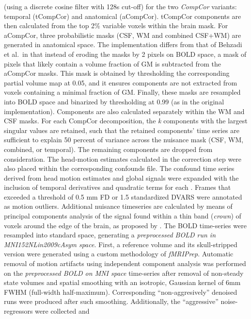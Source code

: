 \documentclass[
]{article}
\begin{document}
\begin{description}
(using a discrete cosine filter with 128s cut-off) for the two
\emph{CompCor} variants: temporal (tCompCor) and anatomical (aCompCor).
tCompCor components are then calculated from the top 2\% variable voxels
within the brain mask. For aCompCor, three probabilistic masks (CSF, WM
and combined CSF+WM) are generated in anatomical space. The
implementation differs from that of Behzadi et al.~in that instead of
eroding the masks by 2 pixels on BOLD space, a mask of pixels that
likely contain a volume fraction of GM is subtracted from the aCompCor
masks. This mask is obtained by thresholding the corresponding partial
volume map at 0.05, and it ensures components are not extracted from
voxels containing a minimal fraction of GM. Finally, these masks are
resampled into BOLD space and binarized by thresholding at 0.99 (as in
the original implementation). Components are also calculated separately
within the WM and CSF masks. For each CompCor decomposition, the
\emph{k} components with the largest singular values are retained, such
that the retained components' time series are sufficient to explain 50
percent of variance across the nuisance mask (CSF, WM, combined, or
temporal). The remaining components are dropped from consideration. The
head-motion estimates calculated in the correction step were also placed
within the corresponding confounds file. The confound time series
derived from head motion estimates and global signals were expanded with
the inclusion of temporal derivatives and quadratic terms for each
\citep{confounds_satterthwaite_2013}. Frames that exceeded a threshold
of 0.5 mm FD or 1.5 standardized DVARS were annotated as motion
outliers. Additional nuisance timeseries are calculated by means of
principal components analysis of the signal found within a thin band
(\emph{crown}) of voxels around the edge of the brain, as proposed by
\citep{patriat_improved_2017}. The BOLD time-series were resampled into
standard space, generating a \emph{preprocessed BOLD run in
MNI152NLin2009cAsym space}. First, a reference volume and its
skull-stripped version were generated using a custom methodology of
\emph{fMRIPrep}. Automatic removal of motion artifacts using independent
component analysis \citep[ICA-AROMA,][]{aroma} was performed on the
\emph{preprocessed BOLD on MNI space} time-series after removal of
non-steady state volumes and spatial smoothing with an isotropic,
Gaussian kernel of 6mm FWHM (full-width half-maximum). Corresponding
``non-aggresively'' denoised runs were produced after such smoothing.
Additionally, the ``aggressive'' noise-regressors were collected and

\end{description}
\end{document}
